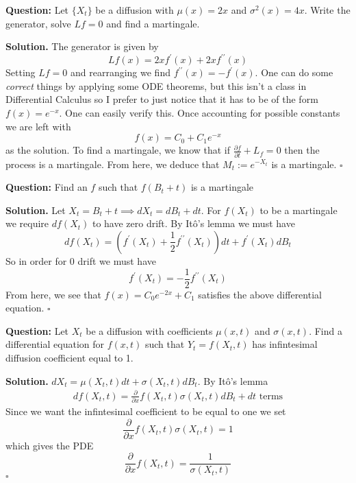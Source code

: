 \documentclass{article}
\begin{document}
\begin{tcolorbox}[colframe=black,colback=gray!5,boxrule=0.5pt]
\textbf{Question:} Let $\{X_t\}$ be a diffusion with $\mu(x) = 2x$ and $\sigma^2(x) = 4x$. Write the generator, solve $Lf=0$ and find a martingale.  
\end{tcolorbox}
\textbf{Solution.} The generator is given by
$$Lf(x) = 2x f^\prime(x) + 2xf^{\prime\prime}(x)$$
Setting $Lf=0$ and rearranging we find $f^{\prime \prime}(x) = -f^\prime(x)$. One can do some \textit{correct} things by applying some ODE theorems, but this isn't a class in Differential Calculus so I prefer to just notice that it has to be of the form $f(x) = e^{-x}$. One can easily verify this. Once accounting for possible constants we are left with 
$$f(x) = C_0 + C_1e^{-x}$$
as the solution. To find a martingale, we know that if $\frac{\partial f}{\partial t} + L_f=0$ then the process is a martingale. From here, we deduce that $M_t := e^{-X_t}$ is a martingale. $\square$


\begin{tcolorbox}[colframe=black,colback=gray!5,boxrule=0.5pt]
\textbf{Question:} Find an $f$ such that $f(B_t + t)$ is a martingale
\end{tcolorbox}
\textbf{Solution.} Let $X_t = B_t +t\implies dX_t=dB_t+dt$. For $f(X_t)$ to be a martingale we require $df(X_t)$ to have zero drift. By Itô's lemma we must have
$$df(X_t) = \left(f^\prime(X_t) +\frac{1}{2}f^{\prime\prime}(X_t)\right)dt + f^\prime(X_t)dB_t$$
So in order for $0$ drift we must have 
$$f^\prime(X_t) = -\frac{1}{2}f^{\prime\prime}(X_t)$$
From here, we see that $f(x) = C_0e^{-2x} + C_1$ satisfies the above differential equation. $\square$

\begin{tcolorbox}[colframe=black,colback=gray!5,boxrule=0.5pt]
\textbf{Question:} Let $X_t$ be a diffusion with coefficients $\mu(x,t)$ and $\sigma(x,t)$. Find a differential equation for $f(x,t)$ such that $Y_t = f(X_t,t)$ has infintesimal diffusion coefficient equal to 1. 
\end{tcolorbox}
\textbf{Solution.} $dX_t = \mu(X_t,t)dt + \sigma(X_t,t)dB_t$. By Itô's lemma
\begin{align*}
    df(X_t,t) = \frac{\partial}{\partial x} f(X_t,t)\sigma(X_t,t)dB_t + \text{$dt$ terms}
\end{align*}
Since we want the infintesimal coefficient to be equal to one we set 
$$\frac{\partial}{\partial x} f(X_t,t)\sigma(X_t,t) = 1$$
which gives the PDE
$$\frac{\partial}{\partial x} f(X_t,t)= \frac{1}{\sigma(X_t,t)}$$
$\square$
\end{document}

